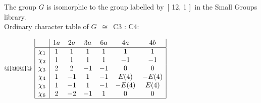 \documentclass[varwidth=\maxdimen,border=10]{standalone}
\begin{document}
The group $G$ is isomorphic to the group labelled by\ [ 12, 1 ]\ in the Small Groups library.\\
Ordinary character table of $G$\ $\cong$\ C3 : C4:\\
\begin{center}
\begin{tabular}{@{}l@{}l@{}l@{}}
\hline
\(\begin{array}{|l|cccccc|}
  & 1a & 2a & 3a & 6a & 4a & 4b\\ \hline
\chi_{1} & 1 & 1 & 1 & 1 & 1 & 1\\
\chi_{2} & 1 & 1 & 1 & 1 & -1 & -1\\
\chi_{3} & 2 & 2 & -1 & -1 & 0 & 0\\
\chi_{4} & 1 & -1 & 1 & -1 & E(4) & -E(4)\\
\chi_{5} & 1 & -1 & 1 & -1 & -E(4) & E(4)\\
\chi_{6} & 2 & -2 & -1 & 1 & 0 & 0\\
\hline
\end{array}\)\\
\end{tabular}
\end{center}
\end{document}
